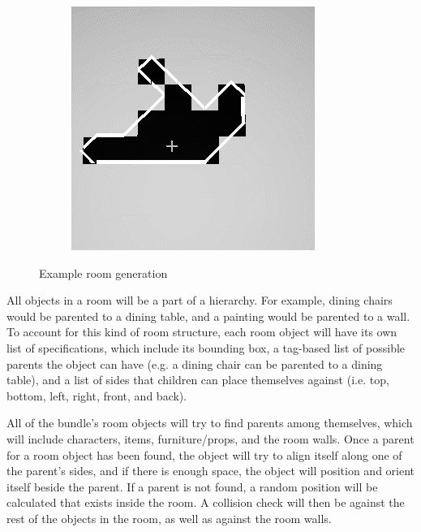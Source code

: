 \documentclass{GlobalDocument}
\begin{document}
\begin{figure}[htb]
\begin{subfigure}{.24\textwidth}
  \end{subfigure}%
  \begin{subfigure}{.24\textwidth}
    \centering
    \includegraphics[width=.9\linewidth]{images/maps_0002}
  \end{subfigure}%
  \caption{Example room generation}
  \label{fig:room_generation_example}
\end{figure}

All objects in a room will be a part of a hierarchy. For example, dining chairs would be parented to a dining table, and a painting would be parented to a wall. To account for this kind of room structure, each room object will have its own list of specifications, which include its bounding box, a tag-based list of possible parents the object can have (e.g. a dining chair can be parented to a dining table), and a list of sides that children can place themselves against (i.e. top, bottom, left, right, front, and back).

 All of the bundle's room objects will try to find parents among themselves, which will include characters, items, furniture/props, and the room walls. Once a parent for a room object has been found, the object will try to align itself along one of the parent's sides, and if there is enough space, the object will position and orient itself beside the parent. If a parent is not found, a random position will be calculated that exists inside the room. A collision check will then be against the rest of the objects in the room, as well as against the room walls.
\end{document}
